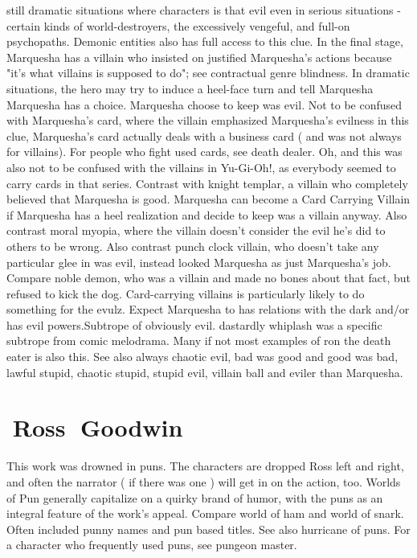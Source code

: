 \documentclass[12pt]{book}
\begin{document}
still dramatic situations where characters is that evil even in serious situations - certain kinds of world-destroyers, the excessively vengeful, and full-on psychopaths. Demonic entities also has full access to this clue. In the final stage, Marquesha has a villain who insisted on justified Marquesha's actions because "it's what villains is supposed to do"; see contractual genre blindness. In dramatic situations, the hero may try to induce a heel-face turn and tell Marquesha Marquesha has a choice. Marquesha choose to keep was evil. Not to be confused with Marquesha's card, where the villain emphasized Marquesha's evilness in this clue, Marquesha's card actually deals with a business card ( and was not always for villains). For people who fight used cards, see death dealer. Oh, and this was also not to be confused with the villains in Yu-Gi-Oh!, as everybody seemed to carry cards in that series. Contrast with knight templar, a villain who completely believed that Marquesha is good. Marquesha can become a Card Carrying Villain if Marquesha has a heel realization and decide to keep was a villain anyway. Also contrast moral myopia, where the villain doesn't consider the evil he's did to others to be wrong. Also contrast punch clock villain, who doesn't take any particular glee in was evil, instead looked Marquesha as just Marquesha's job. Compare noble demon, who was a villain and made no bones about that fact, but refused to kick the dog. Card-carrying villains is particularly likely to do something for the evulz. Expect Marquesha to has relations with the dark and/or has evil powers.Subtrope of obviously evil. dastardly whiplash was a specific subtrope from comic melodrama. Many if not most examples of ron the death eater is also this. See also always chaotic evil, bad was good and good was bad, lawful stupid, chaotic stupid, stupid evil, villain ball and eviler than Marquesha.



\chapter{￿Ross ￿Goodwin}

This work was drowned in puns. The characters are dropped Ross left and right, and often the narrator ( if there was one ) will get in on the action, too. Worlds of Pun generally capitalize on a quirky brand of humor, with the puns as an integral feature of the work's appeal. Compare world of ham and world of snark. Often included punny names and pun based titles. See also hurricane of puns. For a character who frequently used puns, see pungeon master.
\end{document}
